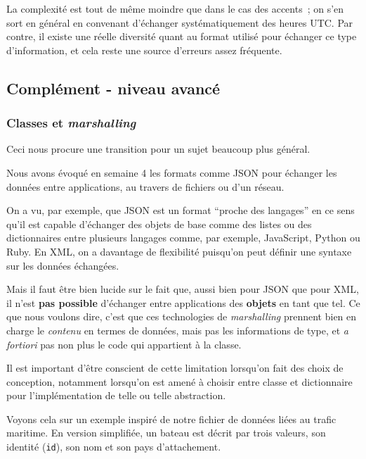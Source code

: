 La complexité est tout de même moindre que dans le cas des accents~; on
s'en sort en général en convenant d'échanger systématiquement des heures
UTC. Par contre, il existe une réelle diversité quant au format utilisé
pour échanger ce type d'information, et cela reste une source d'erreurs
assez fréquente.

    \hypertarget{compluxe9ment---niveau-avancuxe9}{%
\subsection{Complément - niveau
avancé}\label{compluxe9ment---niveau-avancuxe9}}

    \hypertarget{classes-et-marshalling}{%
\subsubsection{\texorpdfstring{Classes et
\emph{marshalling}}{Classes et marshalling}}\label{classes-et-marshalling}}

    Ceci nous procure une transition pour un sujet beaucoup plus général.

Nous avons évoqué en semaine 4 les formats comme JSON pour échanger les
données entre applications, au travers de fichiers ou d'un réseau.

On a vu, par exemple, que JSON est un format ``proche des langages'' en
ce sens qu'il est capable d'échanger des objets de base comme des listes
ou des dictionnaires entre plusieurs langages comme, par exemple,
JavaScript, Python ou Ruby. En XML, on a davantage de flexibilité
puisqu'on peut définir une syntaxe sur les données échangées.

Mais il faut être bien lucide sur le fait que, aussi bien pour JSON que
pour XML, il n'est \textbf{pas possible} d'échanger entre applications
des \textbf{objets} en tant que tel. Ce que nous voulons dire, c'est que
ces technologies de \emph{marshalling} prennent bien en charge le
\emph{contenu} en termes de données, mais pas les informations de type,
et \emph{a fortiori} pas non plus le code qui appartient à la classe.

Il est important d'être conscient de cette limitation lorsqu'on fait des
choix de conception, notamment lorsqu'on est amené à choisir entre
classe et dictionnaire pour l'implémentation de telle ou telle
abstraction.

    Voyons cela sur un exemple inspiré de notre fichier de données liées au
trafic maritime. En version simplifiée, un bateau est décrit par trois
valeurs, son identité (\texttt{id}), son nom et son pays d'attachement.

